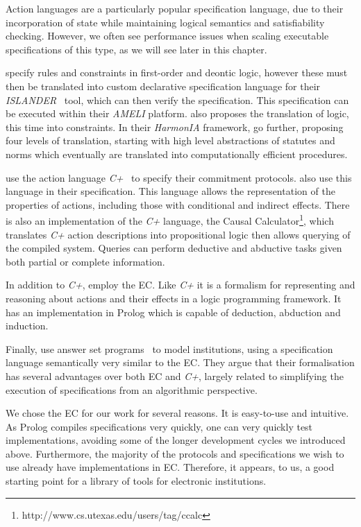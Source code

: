Action languages are a
particularly popular specification language, due to their incorporation of
state while maintaining logical semantics and satisfiability checking.
However, we often see performance issues when scaling executable
specifications of this type, as we will see later in this chapter.

\citet{Arcos2005} specify rules and constraints in first-order and deontic
logic, however these must then be translated into custom declarative
specification language for their \emph{ISLANDER}~\citep{Esteva2002} tool,
which can then verify the specification. This specification can be executed
within their \emph{AMELI} platform. \citet{Aldewereld2006} also proposes the
translation of logic, this time into constraints. In their \emph{HarmonIA}
framework, \citet{Vazquez-Salceda2003} go further, proposing four levels of
translation, starting with high level abstractions of statutes and norms which
eventually are translated into computationally efficient procedures.

\citet{Chopra2006} use the action language \emph{C+}~\citep{Giunchiglia2004}
to specify their commitment protocols. \citet{Artikis2009} also use this
language in their specification. This language allows the representation of
the properties of actions, including those with conditional and indirect
effects. There is also an implementation of the \emph{C+} language, the Causal
Calculator\footnote{http://www.cs.utexas.edu/users/tag/ccalc}, which
translates \emph{C+} action descriptions into propositional logic then allows
querying of the compiled system. Queries can perform deductive and abductive
tasks given both partial or complete information.

In addition to \emph{C+}, \citet{Artikis2009} employ the \ac{EC}. Like
\emph{C+} it is a formalism for representing and reasoning about actions and
their effects in a logic programming framework. It has an implementation in
Prolog which is capable of deduction, abduction and induction.

Finally, \citet{Cliffe2006} use answer set programs~\citep{Baral2003} to model
institutions, using a specification language semantically very similar to the
\ac{EC}. They argue that their formalisation has several advantages over both
\ac{EC} and \emph{C+}, largely related to simplifying the execution of
specifications from an algorithmic perspective.

We chose the \ac{EC} for our work for several reasons. It is easy-to-use and
intuitive. As Prolog compiles specifications very quickly, one can very
quickly test implementations, avoiding some of the longer development cycles
we introduced above. Furthermore, the majority of the protocols and
specifications we wish to use already have implementations in \ac{EC}.
Therefore, it appears, to us, a good starting point for a library of tools for
electronic institutions.

